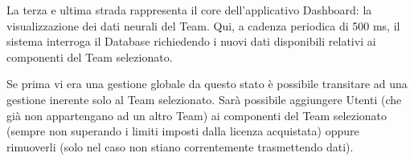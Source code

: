 \noindent La terza e ultima strada rappresenta il core dell'applicativo Dashboard: la visualizzazione dei dati neurali del Team.\newline
Qui, a cadenza periodica di 500 ms, il sistema interroga il Database richiedendo i nuovi dati disponibili relativi ai componenti del Team selezionato.\newline

\noindent Se prima vi era una gestione globale da questo stato è possibile transitare ad una gestione inerente solo al Team selezionato.\newline
Sarà possibile aggiungere Utenti (che già non appartengano ad un altro Team) ai componenti del Team selezionato (sempre non superando i limiti imposti dalla licenza acquistata) oppure rimuoverli (solo nel caso non stiano correntemente trasmettendo dati).
